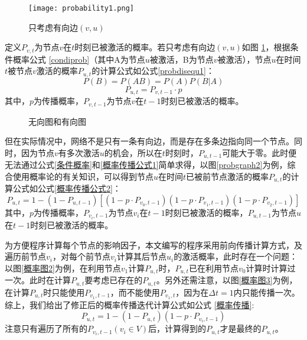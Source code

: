 \documentclass[UTF8]{ctexart}
\newcommand{\upcite}[1]{\textsuperscript{\textsuperscript{\cite{#1}}}}
\begin{document}
\begin{figure}[h!]
	\centering
	\texttt{[image: probability1.png]}
	\caption{只考虑有向边$(v,u)$}
	\label{probability1}
\end{figure}

定义$P_{v,t}$为节点$v$在$t$时刻已被激活的概率。若只考虑有向边$(v,u)$如图 \ref{probability1}，根据条件概率公式 \ref{condiprob}（其中A为节点$u$被激活，B为节点$v$被激活），节点$u$在时间$t$被节点$v$激活的概率$P_{u,t}$的计算公式如公式\ref{probdisequ1}\upcite{statistics}：
\begin{equation}\label{condiprob}
P(B)=P(AB)=P(A)P(B|A)
\end{equation}
\begin{equation}\label{probdisequ1}
P_{u,t}=P_{v,t-1} \cdot p
\end{equation}
其中，$p$为传播概率，$P_{v,t-1}$为节点$v$在$t-1$时刻已被激活的概率。

\begin{figure}[h!]
	\centering
	\hspace{0.1in} 
	\caption{无向图和有向图}
	\label{概率传播特殊情况} %
\end{figure}



但在实际情况中，网络不是只有一条有向边，而是存在多条边指向同一个节点。同时，因为节点$v$有多次激活$u$的机会，所以在$t$时刻时，$P_{u,t-1}$可能大于零。此时便无法通过公式\ref{条件概率}和\ref{概率传播公式1}简单求得，以图\ref{probgraph2}为例，综合使用概率论的有关知识，可以得到节点$u$在时间$t$已被前节点激活的概率$P_{u,t}$的计算公式如公式\ref{概率传播公式2}：
\begin{equation}\label{概率传播公式2}
P_{u,t}=1-(1-P_{u,t-1})[(1-p \cdot P_{v_0,t-1})(1-p \cdot P_{v_1,t-1})(1-p \cdot P_{v_2,t-1})]
\end{equation}
其中，$p$为传播概率，$P_{v_i,t-1}$为节点$v_i$在$t-1$时刻已被激活的概率，$P_{u,t-1}$为节点$u$在$t-1$时刻已被激活的概率。

为方便程序计算每个节点的影响因子，本文编写的程序采用前向传播计算方式，及遍历前节点$v_i$，对每个前节点$v_i$计算其后节点$u_i$的激活概率，此时存在一个问题：以图\ref{概率图2}为例，在利用节点$v_1$计算$P_{u,t}$时，$P_{u,t}$已在利用节点$v_0$计算时计算过一次。此时在计算$P_{u,t}$要考虑已存在的$P_{u,t}$。另外还需注意，以图\ref{概率图3}为例，在计算$P_{u,t}$时只能使用$P_{v_1,t-1}$，而不能使用$P_{v_1,t}$，因为在$\Delta t=1$内只能传播一次。综上，我们给出了修正后的概率传播迭代计算公式如公式 \ref{概率传播}:
\begin{equation}\label{概率传播}
P_{u,t}=1-(1-P_{u,t})(1-p \cdot P_{v_i,t-1})
\end{equation}
注意只有遍历了所有的$P_{v_i,t-1}(v_i \in V)$后，计算得到的$P_{u,t}$才是最终的$P_{u,t}$。
\end{document}
